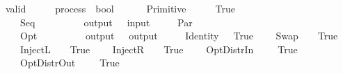 \isamarkupfalse%
\ valid\ {\isacharcolon}{\isacharcolon}\ {\isachardoublequoteopen}{\isacharparenleft}\ \ \ \ process\ {\isasymRightarrow}\ bool{\isachardoublequoteclose}\ \isanewline
\ \ \ \ {\isachardoublequoteopen}\ {\isacharparenleft}Primitive\ \ \ \ \ {\isacharequal}\ True{\isachardoublequoteclose}\isanewline
\ \ {\isacharbar}\ {\isachardoublequoteopen}\ {\isacharparenleft}Seq\ \ \ {\isacharequal}\ {\isacharparenleft}\ \ {\isasymand}\ \ \ {\isasymand}\ output\ \ {\isacharequal}\ input\ \isanewline
\ \ {\isacharbar}\ {\isachardoublequoteopen}\ {\isacharparenleft}Par\ \ \ {\isacharequal}\ {\isacharparenleft}\ \ {\isasymand}\ \ \isanewline
\ \ {\isacharbar}\ {\isachardoublequoteopen}\ {\isacharparenleft}Opt\ \ \ {\isacharequal}\ {\isacharparenleft}\ \ {\isasymand}\ \ \ {\isasymand}\ output\ \ {\isacharequal}\ output\ \isanewline
\ \ {\isacharbar}\ {\isachardoublequoteopen}\ {\isacharparenleft}Identity\ \ {\isacharequal}\ True{\isachardoublequoteclose}\isanewline
\ \ {\isacharbar}\ {\isachardoublequoteopen}\ {\isacharparenleft}Swap\ \ \ {\isacharequal}\ True{\isachardoublequoteclose}\isanewline
\ \ {\isacharbar}\ {\isachardoublequoteopen}\ {\isacharparenleft}InjectL\ \ \ {\isacharequal}\ True{\isachardoublequoteclose}\isanewline
\ \ {\isacharbar}\ {\isachardoublequoteopen}\ {\isacharparenleft}InjectR\ \ \ {\isacharequal}\ True{\isachardoublequoteclose}\isanewline
\ \ {\isacharbar}\ {\isachardoublequoteopen}\ {\isacharparenleft}OptDistrIn\ \ \ \ {\isacharequal}\ True{\isachardoublequoteclose}\isanewline
\ \ {\isacharbar}\ {\isachardoublequoteopen}\ {\isacharparenleft}OptDistrOut\ \ \ \ {\isacharequal}\ True{\isachardoublequoteclose}\isanewline
